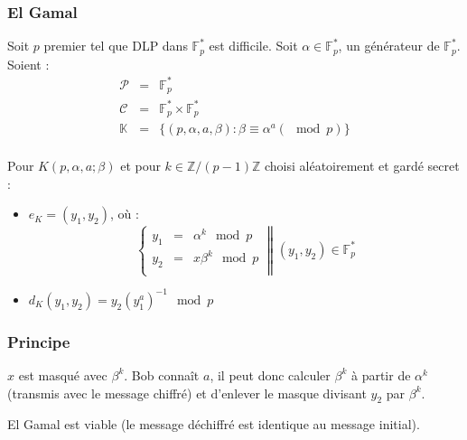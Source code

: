 \documentclass[a4paper, 10pt]{thesis}
\begin{document}
\subsubsection{El Gamal}

Soit $p$ premier tel que DLP dans $\mathbb{F}_p^*$ est difficile. Soit $\alpha \in \mathbb{F}_p^*$,
un générateur de $\mathbb{F}_p^*$. Soient : 
\begin{displaymath}
    \begin{array}{rcl}
        \mathcal{P} & = & \mathbb{F}_p^* \\
        \mathcal{C} & = & \mathbb{F}_p^* \times \mathbb{F}_p^* \\
        \mathbb{K} & = & \{(p, \alpha, a, \beta) : \beta \equiv \alpha^a (\mod p) \} \\
    \end{array}
\end{displaymath}

Pour $K  (p, \alpha, a; \beta)$ et pour $k \in \mathbb{Z}/(p-1)\mathbb{Z}$ choisi aléatoirement et
gardé secret : 
\begin{itemize}
    \item $e_K = (y_1, y_2)$, où :
        \begin{displaymath}
            \left \lbrace 
            \begin{array}{rcl}
                y_1 & = & \alpha^k \mod p \\
                y_2 & = & x \beta^k \mod p \\
            \end{array}
            \right \| 
            (y_1, y_2) \in \mathbb{F}_p^*
        \end{displaymath}
    \item $d_K(y_1, y_2) = y_2 (y_1^a)^{-1} \mod p$
\end{itemize}

\subsubsection*{Principe}

$x$ est masqué avec $\beta ^k$. Bob connaît $a$, il peut donc calculer $\beta^k$ à partir de
$\alpha^k$ (transmis avec le message chiffré) et d'enlever le masque divisant $y_2$ par $\beta^k$.

\begin{prop}
    El Gamal est viable (le message déchiffré est identique au message initial).
\end{prop}
\end{document}
